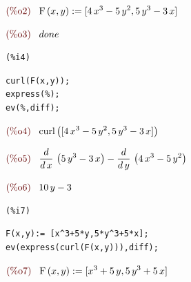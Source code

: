 \documentclass[12pt]{article}
\begin{document}
\begin{math}\displaystyle
\parbox{8ex}{\color{labelcolor}(\%o2) }
\mathrm{F}\left( x,y\right) :=[4\,{x}^{3}-5\,{y}^{2},5\,{y}^{3}-3\,x]
\end{math}

\begin{math}\displaystyle
\parbox{8ex}{\color{labelcolor}(\%o3) }
done
\end{math}


\noindent
\begin{minipage}[t]{8ex}{\color{red}\bf
\begin{verbatim}
(%i4) 
\end{verbatim}}
\end{minipage}
\begin{minipage}[t]{\textwidth}{\color{blue}
\begin{verbatim}
curl(F(x,y));
express(%);
ev(%,diff);
\end{verbatim}}
\end{minipage}
\begin{math}\displaystyle
\parbox{8ex}{\color{labelcolor}(\%o4) }
\mathrm{curl}\left( [4\,{x}^{3}-5\,{y}^{2},5\,{y}^{3}-3\,x]\right) 
\end{math}

\begin{math}\displaystyle
\parbox{8ex}{\color{labelcolor}(\%o5) }
\frac{d}{d\,x}\,\left( 5\,{y}^{3}-3\,x\right) -\frac{d}{d\,y}\,\left( 4\,{x}^{3}-5\,{y}^{2}\right) 
\end{math}

\begin{math}\displaystyle
\parbox{8ex}{\color{labelcolor}(\%o6) }
10\,y-3
\end{math}


\noindent
\begin{minipage}[t]{8ex}{\color{red}\bf
\begin{verbatim}
(%i7) 
\end{verbatim}}
\end{minipage}
\begin{minipage}[t]{\textwidth}{\color{blue}
\begin{verbatim}
F(x,y):= [x^3+5*y,5*y^3+5*x];
ev(express(curl(F(x,y))),diff);
\end{verbatim}}
\end{minipage}
\begin{math}\displaystyle
\parbox{8ex}{\color{labelcolor}(\%o7) }
\mathrm{F}\left( x,y\right) :=[{x}^{3}+5\,y,5\,{y}^{3}+5\,x]
\end{math}
\end{document}
